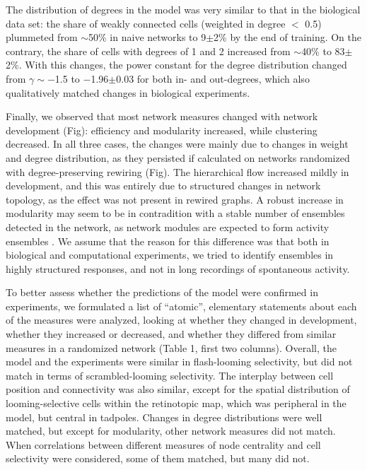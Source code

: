 \documentclass{article}
\begin{document}
The distribution of degrees in the model was very similar to that in the biological data set: the share of weakly connected cells (weighted in degree $<$ 0.5) plummeted from $\sim$50\% in naive networks to 9$\pm$2\% by the end of training. On the contrary, the share of cells with degrees of 1 and 2 increased from $\sim$40\% to 83$\pm$2\%. With this changes, the power constant for the degree distribution changed from $\gamma \sim -$1.5 to $-$1.96$\pm$0.03 for both in- and out-degrees, which also qualitatively matched changes in biological experiments.

Finally, we observed that most network measures changed with network development (Fig): efficiency and modularity increased, while clustering decreased. In all three cases, the changes were mainly due to changes in weight and degree distribution, as they persisted if calculated on networks randomized with degree-preserving rewiring (Fig). The hierarchical flow increased mildly in development, and this was entirely due to structured changes in network topology, as the effect was not present in rewired graphs. A robust increase in modularity may seem to be in contradition with a stable number of ensembles detected in the network, as network modules are expected to form activity ensembles \citep{triplett2018emergence}. We assume that the reason for this difference was that both in biological and computational experiments, we tried to identify ensembles in highly structured responses, and not in long recordings of spontaneous activity.

To better assess whether the predictions of the model were confirmed in experiments, we formulated a list of “atomic”, elementary statements about each of the measures were analyzed, looking at whether they changed in development, whether they increased or decreased, and whether they differed from similar measures in a randomized network (Table 1, first two columns). Overall, the model and the experiments were similar in flash-looming selectivity, but did not match in terms of scrambled-looming selectivity. The interplay between cell position and connectivity was also similar, except for the spatial distribution of looming-selective cells within the retinotopic map, which was peripheral in the model, but central in tadpoles. Changes in degree distributions were well matched, but except for modularity, other network measures did not match. When correlations between different measures of node centrality and cell selectivity were considered, some of them matched, but many did not.
\end{document}
